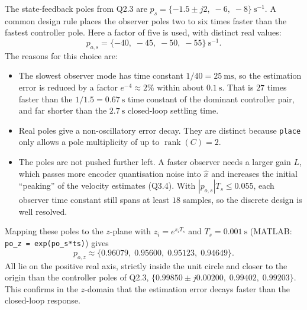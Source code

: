 \documentclass[11pt,a4paper]{article}
\begin{document}
The state-feedback poles from Q2.3 are
$p_s=\{-1.5\pm j2,\;-6,\;-8\}~\mathrm{s^{-1}}$. A common design rule places
the observer poles two to six times faster than the fastest controller pole.
Here a factor of five is used, with distinct real values:
\begin{equation}\label{eq:obs_poles_s}
  p_{o,s}=\{-40,\;-45,\;-50,\;-55\}~\mathrm{s^{-1}}.
\end{equation}
The reasons for this choice are:
\begin{itemize}[nosep]
  \item The slowest observer mode has time constant $1/40=25~\mathrm{ms}$, so
        the estimation error is reduced by a factor $e^{-4}\approx2\%$ within
        about $0.1~\mathrm s$. That is $27$ times faster than the
        $1/1.5=0.67~\mathrm s$ time constant of the dominant controller pair,
        and far shorter than the $2.7~\mathrm s$ closed-loop settling time.
  \item Real poles give a non-oscillatory error decay. They are distinct
        because \texttt{place} only allows a pole multiplicity of up to
        $\operatorname{rank}(C)=2$.
  \item The poles are not pushed further left. A faster observer needs a larger
        gain $L$, which passes more encoder quantisation noise into $\hat x$ and
        increases the initial ``peaking'' of the velocity estimates (Q3.4).
        With $|p_{o,s}|T_s\le0.055$, each observer time constant still spans
        at least $18$ samples, so the discrete design is well resolved.
\end{itemize}

Mapping these poles to the $z$-plane with $z_i=e^{s_iT_s}$ and
$T_s=0.001~\mathrm s$ (MATLAB: \texttt{po\_z = exp(po\_s*ts)}) gives
\begin{equation}\label{eq:obs_poles_z}
  p_{o,z}\approx\{0.96079,\;0.95600,\;0.95123,\;0.94649\}.
\end{equation}
All lie on the positive real axis, strictly inside the unit circle and closer
to the origin than the controller poles of Q2.3,
$\{0.99850\pm j0.00200,\;0.99402,\;0.99203\}$. This confirms in the
$z$-domain that the estimation error decays faster than the closed-loop
response.

\end{document}
